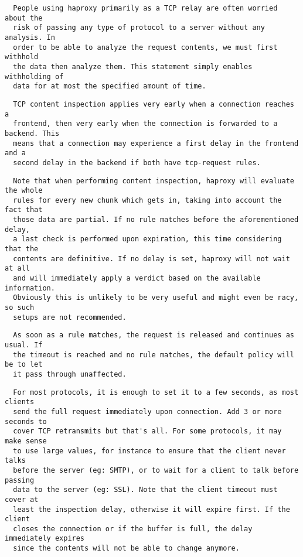 \begin{verbatim}
  People using haproxy primarily as a TCP relay are often worried about the
  risk of passing any type of protocol to a server without any analysis. In
  order to be able to analyze the request contents, we must first withhold
  the data then analyze them. This statement simply enables withholding of
  data for at most the specified amount of time.
\end{verbatim}

\begin{verbatim}
  TCP content inspection applies very early when a connection reaches a
  frontend, then very early when the connection is forwarded to a backend. This
  means that a connection may experience a first delay in the frontend and a
  second delay in the backend if both have tcp-request rules.
\end{verbatim}

\begin{verbatim}
  Note that when performing content inspection, haproxy will evaluate the whole
  rules for every new chunk which gets in, taking into account the fact that
  those data are partial. If no rule matches before the aforementioned delay,
  a last check is performed upon expiration, this time considering that the
  contents are definitive. If no delay is set, haproxy will not wait at all
  and will immediately apply a verdict based on the available information.
  Obviously this is unlikely to be very useful and might even be racy, so such
  setups are not recommended.
\end{verbatim}

\begin{verbatim}
  As soon as a rule matches, the request is released and continues as usual. If
  the timeout is reached and no rule matches, the default policy will be to let
  it pass through unaffected.
\end{verbatim}

\begin{verbatim}
  For most protocols, it is enough to set it to a few seconds, as most clients
  send the full request immediately upon connection. Add 3 or more seconds to
  cover TCP retransmits but that's all. For some protocols, it may make sense
  to use large values, for instance to ensure that the client never talks
  before the server (eg: SMTP), or to wait for a client to talk before passing
  data to the server (eg: SSL). Note that the client timeout must cover at
  least the inspection delay, otherwise it will expire first. If the client
  closes the connection or if the buffer is full, the delay immediately expires
  since the contents will not be able to change anymore.
\end{verbatim}

